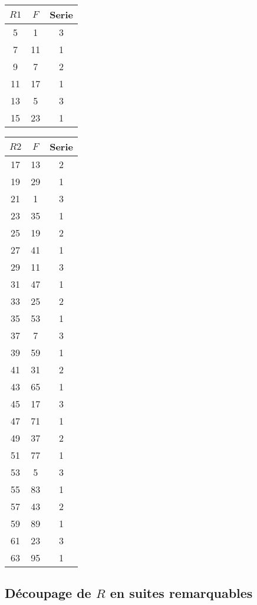 \documentclass{book}
\begin{document}
\begin{tabular}{|c|c|c|}
	\hline
	$R1$ & $F$ & Serie \\
	\hline
	5 & 1 & 3 \\
	\hline
	7 & 11 & 1 \\
	\hline
	9 & 7 & 2 \\
	\hline
	11 & 17 & 1 \\
	\hline
	13 & 5 & 3 \\
	\hline
	15 & 23 & 1 \\
	\hline
\end{tabular}

\begin{tabular}{|c|c|c|}
	\hline
	$R2$ & $F$ & Serie \\
	\hline
	17 & 13 & 2 \\
	\hline
	19 & 29 & 1 \\
	\hline
	21 & 1 & 3 \\
	\hline
	23 & 35 & 1 \\
	\hline
	25 & 19 & 2 \\
	\hline
	27 & 41 & 1 \\
	\hline
	29 & 11 & 3 \\
	\hline
	31 & 47 & 1 \\
	\hline
	33 & 25 & 2 \\
	\hline
	35 & 53 & 1 \\
	\hline
	37 & 7 & 3 \\
	\hline
	39 & 59 & 1 \\
	\hline
	41 & 31 & 2 \\
	\hline
	43 & 65 & 1 \\
	\hline
	45 & 17 & 3 \\
	\hline
	47 & 71 & 1 \\
	\hline
	49 & 37 & 2 \\
	\hline
	51 & 77 & 1 \\
	\hline
	53 & 5 & 3 \\
	\hline
	55 & 83 & 1 \\
	\hline
	57 & 43 & 2 \\
	\hline
	59 & 89 & 1 \\
	\hline
	61 & 23 & 3 \\
	\hline
	63 & 95 & 1 \\
	\hline
\end{tabular}

\subsection{D\'ecoupage de $R$ en suites remarquables}
\end{document}
